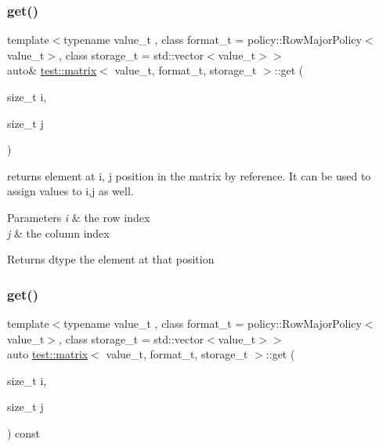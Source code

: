 \subsubsection{\texorpdfstring{get()}{get()}\hspace{0.1cm}{\footnotesize\ttfamily [3/4]}}
{\footnotesize\ttfamily template$<$typename value\+\_\+t , class format\+\_\+t  = policy\+::\+Row\+Major\+Policy$<$value\+\_\+t$>$, class storage\+\_\+t  = std\+::vector$<$value\+\_\+t$>$$>$ \\
auto\& \mbox{\hyperlink{classtest_1_1matrix}{test\+::matrix}}$<$ value\+\_\+t, format\+\_\+t, storage\+\_\+t $>$\+::get (\begin{DoxyParamCaption}\item[{size\+\_\+t}]{i,  }\item[{size\+\_\+t}]{j }\end{DoxyParamCaption})\hspace{0.3cm}{\ttfamily [inline]}}



returns element at i, j position in the matrix by reference. It can be used to assign values to i,j as well. 


\begin{DoxyParams}{Parameters}
{\em i} & the row index \\
\hline
{\em j} & the column index \\
\hline
\end{DoxyParams}
\begin{DoxyReturn}{Returns}
dtype the element at that position 
\end{DoxyReturn}
\mbox{\label{classtest_1_1matrix_a29885efc9b15c38610a6595f5aa18c19}} 
\subsubsection{\texorpdfstring{get()}{get()}\hspace{0.1cm}{\footnotesize\ttfamily [4/4]}}
{\footnotesize\ttfamily template$<$typename value\+\_\+t , class format\+\_\+t  = policy\+::\+Row\+Major\+Policy$<$value\+\_\+t$>$, class storage\+\_\+t  = std\+::vector$<$value\+\_\+t$>$$>$ \\
auto \mbox{\hyperlink{classtest_1_1matrix}{test\+::matrix}}$<$ value\+\_\+t, format\+\_\+t, storage\+\_\+t $>$\+::get (\begin{DoxyParamCaption}\item[{size\+\_\+t}]{i,  }\item[{size\+\_\+t}]{j }\end{DoxyParamCaption}) const\hspace{0.3cm}{\ttfamily [inline]}}



